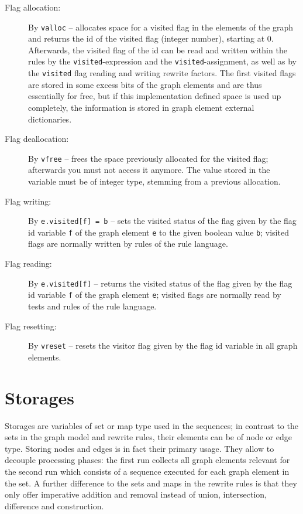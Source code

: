 \begin{description}
\item[Flag allocation:] By \texttt{valloc}\label{allocvisitflag} -- allocates space for a visited flag in the elements of the graph and returns the id of the visited flag (integer number), starting at 0.
Afterwards, the visited flag of the id can be read and written within the rules by the \texttt{visited}-expression and the \texttt{visited}-assignment,
as well as by the \texttt{visited} flag reading and writing rewrite factors.
The first visited flags are stored in some excess bits of the graph elements and are thus essentially for free,
but if this implementation defined space is used up completely, the information is stored in graph element external dictionaries.
\item[Flag deallocation:] By \texttt{vfree} -- frees the space previously allocated for the visited flag; afterwards you must not access it anymore. 
The value stored in the variable must be of integer type, stemming from a previous allocation.
\item[Flag writing:] By \texttt{e.visited[f] = b} -- sets the visited status of the flag given by the flag id variable \texttt{f} of the graph element \texttt{e} to the given boolean value \texttt{b}; visited flags are normally written by rules of the rule language.
\item[Flag reading:] By \texttt{e.visited[f]} -- returns the visited status of the flag given by the flag id variable \texttt{f} of the graph element \texttt{e}; visited flags are normally read by tests and rules of the rule language.
\item[Flag resetting:] By \texttt{vreset} -- resets the visitor flag given by the flag id variable in all graph elements.
\end{description}


\section{Storages}

Storages are variables of set or map type used in the sequences;
in contrast to the sets in the graph model and rewrite rules, their elements can be of node or edge type. 
Storing nodes and edges is in fact their primary usage. 
They allow to decouple processing phases: the first run collects all graph elements relevant for the second run which consists of a sequence executed for each graph element in the set.
A further difference to the sets and maps in the rewrite rules is that they only offer imperative addition and removal instead of union, intersection, difference and construction.
 
